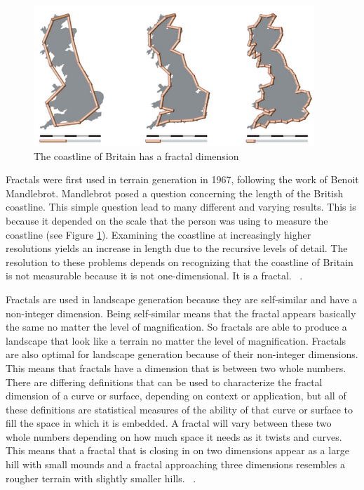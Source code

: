 \documentclass[11pt,twocolumn]{article}
\begin{document}
	\begin{figure}[ht]
	\includegraphics[scale=0.5]{BritainCoastline.png}
	\caption{The coastline of Britain has a fractal dimension}
	\label{fig:britcoast}
	\end{figure}
	Fractals were first used in terrain generation in 1967, following the work of Benoit Mandlebrot.
	Mandlebrot posed a question concerning the length of the British coastline.  This simple question
	lead to many different and varying results. This is because it depended on the scale that the person was using to measure the
	coastline (see Figure \ref{fig:britcoast}). Examining the coastline at increasingly higher resolutions yields an increase in
	length due to the recursive levels of detail. The resolution to these problems depends on recognizing that the coastline of Britain is not measurable because
	it is not one-dimensional. It is a fractal. ~\cite{Mandelbrot}.

	Fractals are used in landscape generation because they are self-similar and have a non-integer dimension. Being self-similar means
	that the fractal appears basically the same no matter the level of magnification. So fractals are able to produce a landscape
	that look like a terrain no matter the level of magnification. Fractals are also optimal for landscape generation because of
	their non-integer dimensions. This means that fractals have a dimension that is between two whole numbers.
	There are differing definitions that can be used to characterize the fractal dimension of a curve or surface, depending on context or
	application, but all of these definitions are statistical measures of the ability of that curve or surface to fill the space in which
	it is embedded. A fractal will vary between these two whole numbers depending on how much space it needs as it twists and curves.
	This means that a fractal that is closing in on two dimensions appear as a large hill with small mounds and a fractal approaching three dimensions resembles a
	rougher terrain with slightly smaller hills. ~\cite{Mandelbrot}.
\end{document}
